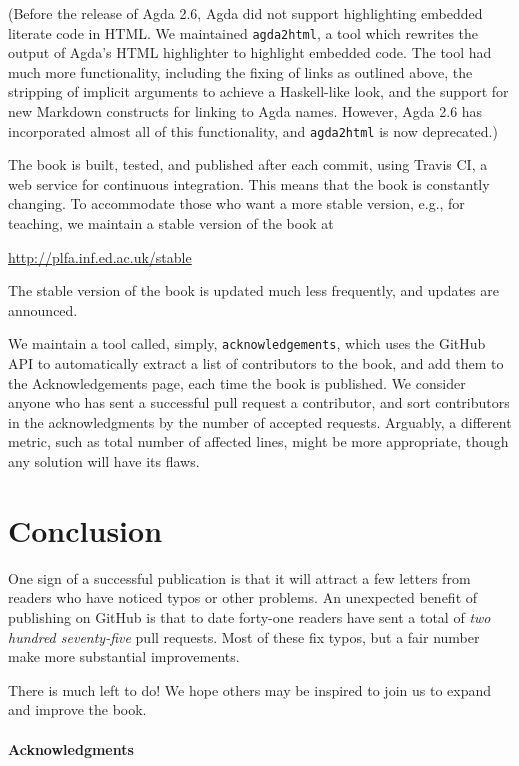 \documentclass[preprint,authoryear]{elsarticle}
\begin{document}
(Before the release of Agda 2.6, Agda did not support highlighting embedded
literate code in HTML.  We maintained \texttt{agda2html}, a tool which rewrites
the output of Agda's HTML highlighter to highlight embedded code. The tool had
much more functionality, including the fixing of links as outlined above, the
stripping of implicit arguments to achieve a Haskell-like look, and the support
for new Markdown constructs for linking to Agda names. However, Agda 2.6 has
incorporated almost all of this functionality, and \texttt{agda2html} is now
deprecated.)

The book is built, tested, and published after each commit, using Travis CI, a
web service for continuous integration.  This means that the book is constantly
changing.  To accommodate those who want a more stable version, e.g., for
teaching, we maintain a stable version of the book at
\begin{center}
  \url{http://plfa.inf.ed.ac.uk/stable}
\end{center}
The stable version of the book is updated much less frequently, and updates
are announced.

We maintain a tool called, simply, \texttt{acknowledgements}, which uses
the GitHub API to automatically extract a list of contributors to the book, and
add them to the Acknowledgements page, each time the book is published.  We
consider anyone who has sent a successful pull request a contributor, and sort
contributors in the acknowledgments by the number of accepted requests.
Arguably, a different metric, such as total number of affected lines, might be
more appropriate, though any solution will have its flaws.

\section{Conclusion}

One sign of a successful publication is that it will attract a few letters from
readers who have noticed typos or other problems.  An unexpected benefit of
publishing on GitHub is that to date forty-one readers have sent a total of
\emph{two hundred seventy-five} pull requests.  Most of these fix typos, but a
fair number make more substantial improvements.

There is much left to do!  We hope others may be inspired to join us
to expand and improve the book.

\paragraph{Acknowledgments}
\end{document}
